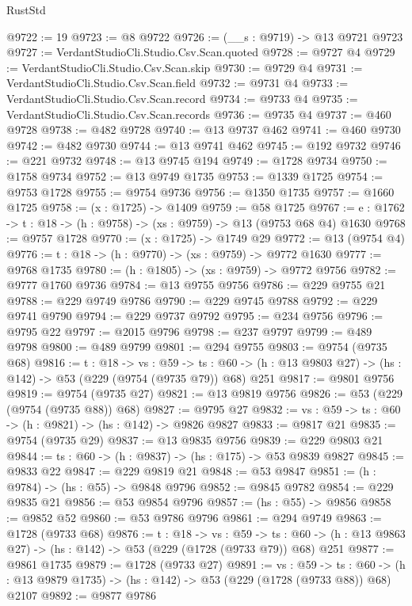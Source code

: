 \begin{lexlean}{RustStd}
\begin{coremodule}
@9722 := 19
@9723 := @8 @9722
@9726 := (__s : @9719) -> @13 @9721 @9723
@9727 := VerdantStudioCli.Studio.Csv.Scan.quoted
@9728 := @9727 @4
@9729 := VerdantStudioCli.Studio.Csv.Scan.skip
@9730 := @9729 @4
@9731 := VerdantStudioCli.Studio.Csv.Scan.field
@9732 := @9731 @4
@9733 := VerdantStudioCli.Studio.Csv.Scan.record
@9734 := @9733 @4
@9735 := VerdantStudioCli.Studio.Csv.Scan.records
@9736 := @9735 @4
@9737 := @460 @9728
@9738 := @482 @9728
@9740 := @13 @9737 @462
@9741 := @460 @9730
@9742 := @482 @9730
@9744 := @13 @9741 @462
@9745 := @192 @9732
@9746 := @221 @9732
@9748 := @13 @9745 @194
@9749 := @1728 @9734
@9750 := @1758 @9734
@9752 := @13 @9749 @1735
@9753 := @1339 @1725
@9754 := @9753 @1728
@9755 := @9754 @9736
@9756 := @1350 @1735
@9757 := @1660 @1725
@9758 := (x : @1725) -> @1409
@9759 := @58 @1725
@9767 := {e : @1762} -> {t : @18} -> (h : @9758) -> (xs : @9759) -> @13 (@9753 @68 @4) @1630
@9768 := @9757 @1728
@9770 := (x : @1725) -> @1749 @29
@9772 := @13 (@9754 @4)
@9776 := {t : @18} -> (h : @9770) -> (xs : @9759) -> @9772 @1630
@9777 := @9768 @1735
@9780 := (h : @1805) -> (xs : @9759) -> @9772 @9756
@9782 := @9777 @1760 @9736
@9784 := @13 @9755 @9756
@9786 := @229 @9755 @21
@9788 := @229 @9749 @9786
@9790 := @229 @9745 @9788
@9792 := @229 @9741 @9790
@9794 := @229 @9737 @9792
@9795 := @234 @9756
@9796 := @9795 @22
@9797 := @2015 @9796
@9798 := @237 @9797
@9799 := @489 @9798
@9800 := @489 @9799
@9801 := @294 @9755
@9803 := @9754 (@9735 @68)
@9816 := {t : @18} ->
  {vs : @59} ->
  {ts : @60} -> (h : @13 @9803 @27) -> (hs : @142) -> @53 (@229 (@9754 (@9735 @79)) @68) @251
@9817 := @9801 @9756
@9819 := @9754 (@9735 @27)
@9821 := @13 @9819 @9756
@9826 := @53 (@229 (@9754 (@9735 @88)) @68)
@9827 := @9795 @27
@9832 := {vs : @59} -> {ts : @60} -> (h : @9821) -> (hs : @142) -> @9826 @9827
@9833 := @9817 @21
@9835 := @9754 (@9735 @29)
@9837 := @13 @9835 @9756
@9839 := @229 @9803 @21
@9844 := {ts : @60} -> (h : @9837) -> (hs : @175) -> @53 @9839 @9827
@9845 := @9833 @22
@9847 := @229 @9819 @21
@9848 := @53 @9847
@9851 := (h : @9784) -> (hs : @55) -> @9848 @9796
@9852 := @9845 @9782
@9854 := @229 @9835 @21
@9856 := @53 @9854 @9796
@9857 := (hs : @55) -> @9856
@9858 := @9852 @52
@9860 := @53 @9786 @9796
@9861 := @294 @9749
@9863 := @1728 (@9733 @68)
@9876 := {t : @18} ->
  {vs : @59} ->
  {ts : @60} -> (h : @13 @9863 @27) -> (hs : @142) -> @53 (@229 (@1728 (@9733 @79)) @68) @251
@9877 := @9861 @1735
@9879 := @1728 (@9733 @27)
@9891 := {vs : @59} ->
  {ts : @60} -> (h : @13 @9879 @1735) -> (hs : @142) -> @53 (@229 (@1728 (@9733 @88)) @68) @2107
@9892 := @9877 @9786

\end{coremodule}
\end{lexlean}
